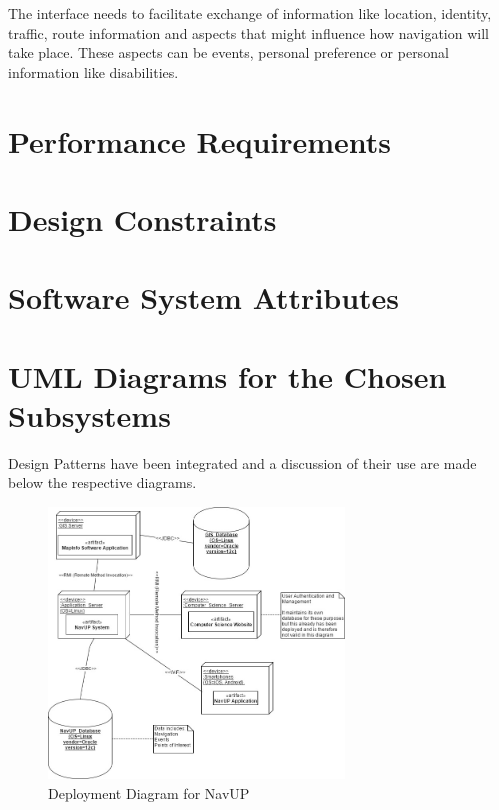\documentclass[runningheads,a4paper]{article}
\begin{document}
The interface needs to facilitate exchange of information like location, identity, traffic, route information and aspects that might 
influence how navigation will take place. These aspects can be events, personal preference or personal 
information like disabilities. 



\section{Performance Requirements}



\section{Design Constraints}



\section{Software System Attributes}



\section{UML Diagrams for the Chosen Subsystems}

Design Patterns have been integrated and a discussion of their use are made below the respective diagrams.


\begin{figure}[H]
   	\centering
   	\includegraphics[width=0.7\textwidth]{DeploymentDiagram.jpg}
   	\caption{Deployment Diagram for NavUP}
\end{figure}
\end{document}
